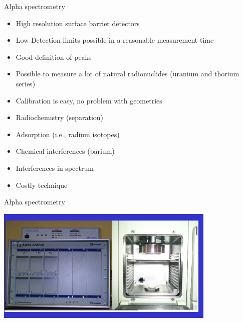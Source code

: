 \begin{frame}{Alpha spectrometry}

\begin{exampleblock}{}

\begin{itemize}
	\item High resolution surface barrier detectors
  \item Low Detection limits possible in a reasonable measurement time
  \item Good definition of peaks
 \item Possible to measure a lot of natural radionuclides (uranium and thorium series)
\item  Calibration is easy, no problem with geometries
\end{itemize}

\end{exampleblock}

\begin{alertblock}{}

\begin{itemize}
	\item Radiochemistry (separation)
 \item Adsorption (i.e., radium isotopes)
\item  Chemical interferences (barium) 
 \item Interferences in spectrum
 \item Costly technique
\end{itemize}

\end{alertblock}

\end{frame}

\begin{frame}{Alpha spectrometry}

\centering
\includegraphics[scale=0.8]{figures/alpha_device.png}

\end{frame}

